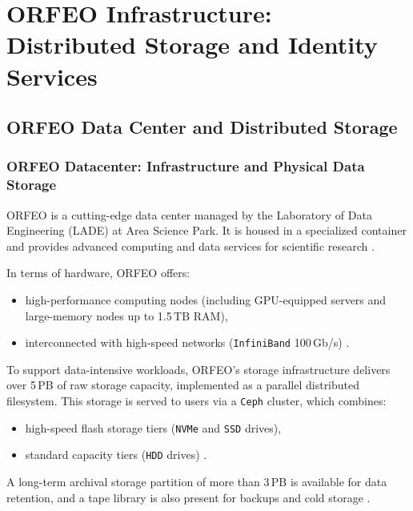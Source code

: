 \chapter{ORFEO Infrastructure: Distributed Storage and Identity Services}\label{chap:infra}

\section{ORFEO Data Center and Distributed Storage}

\subsection{ORFEO Datacenter: Infrastructure and Physical Data Storage}

ORFEO is a cutting-edge data center managed by the Laboratory of Data 
Engineering (LADE) at Area Science Park. It is housed in a specialized container 
and provides advanced computing and data services for scientific 
research \parencite{ORFEO_Docs_Home,LADEPage}. 

\medskip

In terms of hardware, ORFEO offers:
\begin{itemize}
	\item high-performance computing nodes (including GPU-equipped servers 
	and large-memory nodes up to 1.5\,TB RAM), 
	\item interconnected with high-speed networks (\texttt{InfiniBand} 100\,Gb/s) \parencite{ORFEO_Docs_Computational}.
\end{itemize}

To support data-intensive workloads, ORFEO’s storage infrastructure delivers 
over 5\,PB of raw storage capacity, implemented as a parallel distributed 
filesystem. This storage is served to users via a \texttt{Ceph} cluster, which 
combines:
\begin{itemize}
	\item high-speed flash storage tiers (\texttt{NVMe} and \texttt{SSD} drives), 
	\item standard capacity tiers (\texttt{HDD} drives) \parencite{ORFEO_Docs_Storage,orfeo-changelog-2024}.
\end{itemize}

A long-term archival storage partition of more than 3\,PB is available for data 
retention, and a tape library is also present for backups and cold 
storage \parencite{ORFEO_Docs_Storage,orfeo-changelog-2024}. 

\medskip

